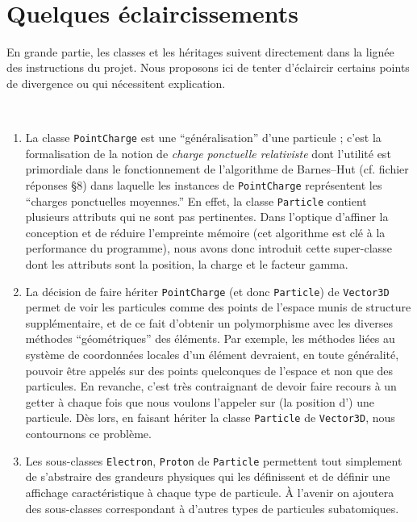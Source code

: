 \documentclass[12pt, letterpaper, twoside]{article}
\newcommand{\T}[1]{\texttt{#1}}
\begin{document}
\ \linebreak
\ \linebreak
\section{Quelques éclaircissements}
\noindent En grande partie, les classes et les héritages suivent directement dans la lignée des instructions du projet. Nous proposons ici de tenter d'éclaircir certains points de divergence ou qui nécessitent explication.

\ \linebreak
\begin{enumerate}
	\item La classe \T{PointCharge} est une ``généralisation'' d'une particule ; c'est la formalisation de la notion de \textit{charge ponctuelle relativiste} dont l'utilité est primordiale dans le fonctionnement de l'algorithme de Barnes--Hut (cf. fichier réponses \S 8) dans laquelle les instances de \T{PointCharge} représentent les ``charges ponctuelles moyennes.'' En effet, la classe \T{Particle} contient plusieurs attributs qui ne sont pas pertinentes. Dans l'optique d'affiner la conception et de réduire l'empreinte mémoire (cet algorithme est clé à la performance du programme), nous avons donc introduit cette super-classe dont les attributs sont la position, la charge et le facteur gamma.

	\item La décision de faire hériter \T{PointCharge} (et donc \T{Particle}) de \T{Vector3D} permet de voir les particules comme des points de l'espace munis de structure supplémentaire, et de ce fait d'obtenir un polymorphisme avec les diverses méthodes ``géométriques'' des éléments. Par exemple, les méthodes liées au système de coordonnées locales d'un élément devraient, en toute généralité, pouvoir être appelés sur des points quelconques de l'espace et non que des particules. En revanche, c'est très contraignant de devoir faire recours à un getter à chaque fois que nous voulons l'appeler sur (la position d') une particule. Dès lors, en faisant hériter la classe \T{Particle} de \T{Vector3D}, nous contournons ce problème.

	\item Les sous-classes \T{Electron}, \T{Proton} de \T{Particle} permettent tout simplement de s'abstraire des grandeurs physiques qui les définissent et de définir une affichage caractéristique à chaque type de particule. À l'avenir on ajoutera des sous-classes correspondant à d'autres types de particules subatomiques.


\end{enumerate}
\end{document}
